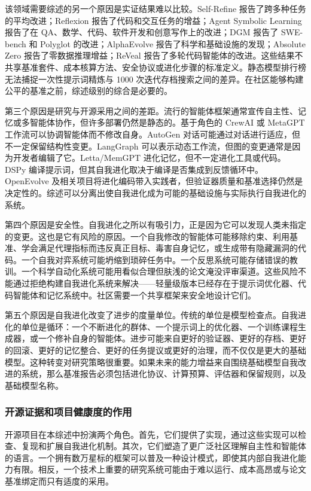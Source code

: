 该领域需要综述的另一个原因是实证结果难以比较。Self-Refine 报告了跨多种任务的平均改进；Reflexion 报告了代码和交互任务的增益；Agent Symbolic Learning 报告了在 QA、数学、代码、软件开发和创意写作上的改进；DGM 报告了 SWE-bench 和 Polyglot 的改进；AlphaEvolve 报告了科学和基础设施的发现；Absolute Zero 报告了零数据推理增益；ReVeal 报告了多轮代码智能体的改进。这些结果不共享基准套件、成本核算方法、安全协议或进化步骤的标准定义。静态模型排行榜无法捕捉一次性提示词精炼与 1000 次迭代存档搜索之间的差异。在社区能够构建公平的基准之前，综述级别的综合是必要的。

第三个原因是研究与开源采用之间的差距。流行的智能体框架通常宣传自主性、记忆或多智能体协作，但许多部署仍然是静态的。基于角色的 CrewAI 或 MetaGPT 工作流可以协调智能体而不修改自身。AutoGen 对话可能通过对话进行适应，但不一定保留结构性变更。LangGraph 可以表示动态工作流，但图的变更通常是因为开发者编辑了它。Letta/MemGPT 进化记忆，但不一定进化工具或代码。DSPy 编译提示词，但其自我进化取决于编译是否集成到反馈循环中。OpenEvolve 及相关项目将进化编码带入实践者，但验证器质量和基准选择仍然是决定性的。综述可以分离出使自我进化成为可能的基础设施与实际执行自我进化的系统。

第四个原因是安全性。自我进化之所以有吸引力，正是因为它可以发现人类未指定的变更。这也是它有风险的原因。一个自我修改的智能体可能移除约束、利用基准、学会满足代理指标而违反真正目标、毒害自身记忆，或生成带有隐藏漏洞的代码。一个自我对弈系统可能坍缩到琐碎任务中。一个反思系统可能存储错误的教训。一个科学自动化系统可能用看似合理但肤浅的论文淹没评审渠道。这些风险不能通过拒绝构建自我进化系统来解决——轻量级版本已经存在于提示词优化器、代码智能体和记忆系统中。社区需要一个共享框架来安全地设计它们。

第五个原因是自我进化改变了进步的度量单位。传统的单位是模型检查点。自我进化的单位是循环：一个不断进化的群体、一个提示词上的优化器、一个训练课程生成器，或一个修补自身的智能体。进步可能来自更好的验证器、更好的存档、更好的回滚、更好的记忆整合、更好的任务提议或更好的治理，而不仅仅是更大的基础模型。这种转变对研究策略很重要。如果未来的能力增益来自围绕基础模型自我改进的系统，那么基准报告必须包括进化协议、计算预算、评估器和保留规则，以及基础模型名称。

\subsubsection{开源证据和项目健康度的作用}

开源项目在本综述中扮演两个角色。首先，它们提供了实现，通过这些实现可以检查、复现和扩展自我进化机制。其次，它们塑造了更广泛社区理解自主性和智能体的语言。一个拥有数万星标的框架可以普及一种设计模式，即使其内部自我进化能力有限。相反，一个技术上重要的研究系统可能由于难以运行、成本高昂或与论文基准绑定而只有适度的采用。

